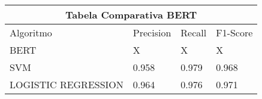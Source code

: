 \begin{table}
 \label{table:comparativobert}
\begin{tabular}{ |p{3cm}||p{3cm}|p{3cm}|p{3cm}|  }
 \hline
 \multicolumn{4}{|c|}{Tabela Comparativa BERT} \\
 \hline
 Algoritmo & Precision & Recall & F1-Score\\
 \hline
 BERT & X & X & X \\
 SVM & 0.958 & 0.979 & 0.968 \\
 LOGISTIC REGRESSION & 0.964 & 0.976 & 0.971  \\
 \hline
\end{tabular}
\end{table}



